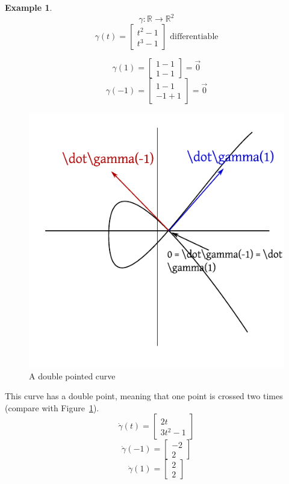 \documentclass[a4paper,landscape,twocolumn]{article}
\theoremstyle{definition}
\newtheorem{ex}{Example}
\begin{document}
\begin{ex}
  \[ \gamma: \mathbb R \to \mathbb R^2 \]
  \[ \gamma(t) = \begin{bmatrix} t^2 - 1 \\ t^3 - 1 \end{bmatrix} \text{ differentiable} \]

  \[ \gamma(1) = \begin{bmatrix} 1-1 \\ 1-1 \end{bmatrix} = \vec0 \]
  \[ \gamma(-1) = \begin{bmatrix} 1-1 \\ -1+1 \end{bmatrix} = \vec0 \]

  \begin{figure}[!h]
    \begin{center}
      \includegraphics{img/double_point.pdf}
      \caption{A double pointed curve}
      \label{img:dbl-point}
    \end{center}
  \end{figure}

  This curve has a double point, meaning that one point is crossed two times (compare with Figure~\ref{img:dbl-point}).
  \[ \dot\gamma(t) = \begin{bmatrix} 2t \\ 3t^2 - 1 \end{bmatrix} \]
  \[ \dot\gamma(-1) = \begin{bmatrix} -2 \\ 2 \end{bmatrix} \]
  \[ \dot\gamma(1) = \begin{bmatrix} 2 \\ 2 \end{bmatrix} \]
\end{ex}
\end{document}
